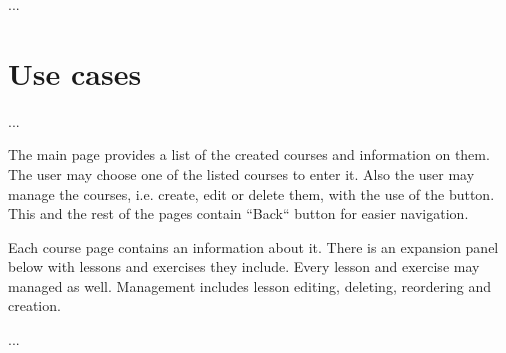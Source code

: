 ...

\section{Use cases}

...

The main page provides a list of the created courses and information on them. The user may choose one of the listed courses to enter it. Also the user may manage the courses, i.e. create, edit or delete them, with the use of the button. This and the rest of the pages contain ``Back`` button for easier navigation.

Each course page contains an information about it. There is an expansion panel below with lessons and exercises they include. Every lesson and exercise may managed as well. Management includes lesson editing, deleting, reordering and creation.

...
